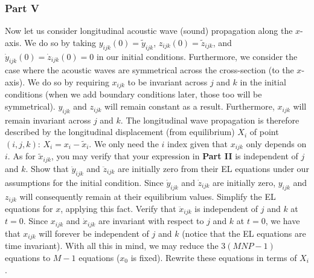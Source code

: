 \documentclass[letterpaper,12pt]{article}
\begin{document}
\begin{flushleft}
    \subsubsection*{Part V}
    Now let us consider longitudinal acoustic wave (sound) propagation along the $x$-axis. We do so by taking $y_{ijk}(0) = \tilde{y}_{ijk}$, $z_{ijk}(0) = \tilde{z}_{ijk}$, and $\dot{y}_{ijk}(0) = \dot{z}_{ijk}(0) = 0$ in our initial conditions. Furthermore, we consider the case where the acoustic waves are symmetrical across the cross-section (to the $x$-axis). We do so by requiring $x_{ijk}$ to be invariant across $j$ and $k$ in the initial conditions (when we add boundary conditions later, those too will be symmetrical). $y_{ijk}$ and $z_{ijk}$ will remain constant as a result. Furthermore, $x_{ijk}$ will remain invariant across $j$ and $k$. The longitudinal wave propagation is therefore described by the longitudinal displacement (from equilibrium) $X_i$ of point $(i,j,k)$: $X_i = x_i - \tilde{x}_i$. We only need the $i$ index given that $x_{ijk}$ only depends on $i$. As for $\tilde{x}_{ijk}$, you may verify that your expression in \textbf{Part II} is independent of $j$ and $k$. \newline\newline
    Show that $\ddot{y}_{ijk}$ and $\ddot{z}_{ijk}$ are initially zero from their EL equations under our assumptions for the initial condition. Since $\dot{y}_{ijk}$ and $\dot{z}_{ijk}$ are initially zero, $y_{ijk}$ and $z_{ijk}$ will consequently remain at their equilibrium values. Simplify the EL equations for $x$, applying this fact. Verify that $\ddot{x}_{ijk}$ is independent of $j$ and $k$ at $t=0$. Since $x_{ijk}$ and $\dot{x}_{ijk}$ are invariant with respect to $j$ and $k$ at $t=0$, we have that $x_{ijk}$ will forever be independent of $j$ and $k$ (notice that the EL equations are time invariant). With all this in mind, we may reduce the $3(MNP - 1)$ equations to $M - 1$ equations ($x_0$ is fixed). Rewrite these equations in terms of $X_i$.


\end{flushleft}
\end{document}
